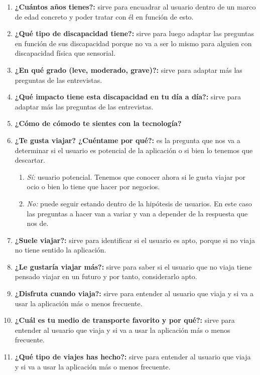 \begin{enumerate}
    \item {\textbf{¿Cuántos años tienes?:}} sirve para encuadrar al usuario dentro de un marco de edad concreto y poder tratar con él en función de esto.
    \item {\textbf{¿Qué tipo de discapacidad tiene?:}} sirve para luego adaptar las preguntas en función de sus discapacidad porque no va a ser lo
                mismo para alguien con discapacidad física que sensorial.
    \item {\textbf{¿En qué grado (leve, moderado, grave)?:}} sirve para adaptar más las preguntas de las entrevistas.
    \item {\textbf{¿Qué impacto tiene esta discapacidad en tu día a día?:}} sirve para adaptar más las preguntas de las entrevistas.
    \item {\textbf{¿Cómo de cómodo te sientes con la tecnología?}}
    \item {\textbf{¿Te gusta viajar? ¿Cuéntame por qué?:}} es la pregunta que nos va a determinar si el usuario es potencial de la aplicación
                o si bien lo tenemos que descartar.
    \begin{enumerate}
        \item {\textit{Sí:}} usuario potencial. Tenemos que conocer ahora si le gusta viajar por ocio o bien lo tiene que hacer por negocios.
        \item {\textit{No:}} puede seguir estando dentro de la hipótesis de usuarios. En este caso las preguntas a hacer van a variar y van a
                        depender de la respuesta que nos de.
    \end{enumerate}
    \item {\textbf{¿Suele viajar?:}} sirve para identificar si el usuario es apto, porque si no viaja no tiene sentido la aplicación.
    \item {\textbf{¿Le gustaría viajar más?:}} sirve para saber si el usuario que no viaja tiene pensado viajar en un futuro y por tanto, considerarlo apto.
    \item {\textbf{¿Disfruta cuando viaja?:}} sirve para entender al usuario que viaja y si va a usar la aplicación más o menos frecuente.
    \item {\textbf{¿Cuál es tu medio de transporte favorito y por qué?:}} sirve para entender al usuario que viaja y si va a usar la aplicación más o menos frecuente.
    \item {\textbf{¿Qué tipo de viajes has hecho?:}} sirve para entender al usuario que viaja y si va a usar la aplicación más o menos frecuente.

\end{enumerate}
